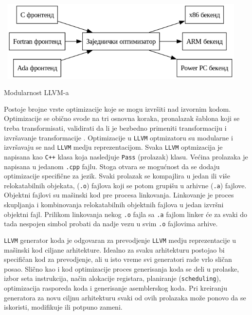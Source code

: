 \begin{listing}[H]
\begin{center}
\includegraphics[width=5in, height=1.6in]{assets/images/modern_compiler_design.png}
\end{center}
\caption{Modularnost LLVM-a}
\label{lst:llvm_modular}
\end{listing}

Postoje brojne vrste optimizacije koje se mogu izvršiti nad izvornim kodom. Optimizacije se obično svode 
na tri osnovna koraka, pronalazak šablona koji se treba transformisati, validirati da li je bezbedno primeniti 
transformaciju i izvršavanje transformacije \cite{oss-architecture}. Optimizacije u \verb|LLVM| optmizatoru su modularne i izvršavaju 
se nad \verb|LLVM| medju reprezentacijom. Svaka \verb|LLVM| optmizacija je napisana kao \verb|C++| klasa koja 
nasledjuje \verb|Pass| (prolazak) klasu. Većina prolazaka je napisana u jedanom \verb|.cpp| fajlu.
Stoga otvara se mogućnost da se dodaju optimizacije specifične za jezik. Svaki prolazak se kompajlira u jedan 
ili više relokatabilnih objekata, (\verb|.o|) fajlova koji se potom grupišu u arhivne (\verb|.a|) fajlove. Objektni fajlovi 
su mašinski kod pre procesa linkovanja. Linkovanje je proces skupljanja i kombinovanja relokatabilnih objektnih fajlova
u jedan izvršni objektni fajl. Prilikom linkovanja nekog \verb|.o| fajla sa \verb|.a| fajlom linker će 
za svaki do tada nespojen simbol probati da nadje vezu u svim \verb|.o| fajlovima arhive.

\verb|LLVM| generator koda je odgovaran za prevodjenje \verb|LLVM| medju reprezentacije u mašinski kod ciljane 
arhitekture. Idealno za svaku arhitekturu postojao bi specifičan kod za prevodjenje, ali u isto vreme 
svi generatori rade vrlo sličan posao. Slično kao i kod optimizacije proces generisanja koda se deli u prolaske,
izbor seta instrukcija, način alokacije registara, planiranje (\verb|scheduling|), optimizacija rasporeda 
koda i generisanje asemblerskog koda. Pri kreiranju generatora za novu ciljnu arhitekturu svaki od ovih prolazaka
može ponovo da se iskoristi, modifikuje ili potpuno zameni.

